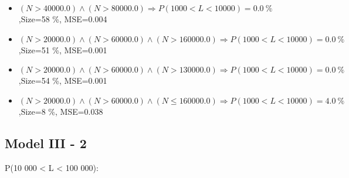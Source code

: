 \documentclass[numbered]{CSL}
\begin{document}
\begin{itemize}
\item $(N > 40000.0) \land (N > 80000.0) \Rightarrow P(1 000 < L < 10 000) = 0.0~\%$,\hfill Size=58 \%, MSE=0.004
\item $(N > 20000.0) \land (N > 60000.0) \land (N > 160000.0) \Rightarrow P(1 000 < L < 10 000) = 0.0~\%$,\hfill Size=51 \%, MSE=0.001
\item $(N > 20000.0) \land (N > 60000.0) \land (N > 130000.0) \Rightarrow P(1 000 < L < 10 000) = 0.0~\%$,\hfill Size=54 \%, MSE=0.001
\item $(N > 20000.0) \land (N > 60000.0) \land (N \leq 160000.0) \Rightarrow P(1 000 < L < 10 000) = 4.0~\%$,\hfill Size=8 \%, MSE=0.038
\end{itemize}

\subsection{Model III - 2}
P(10 000 < L < 100 000):
\end{document}
